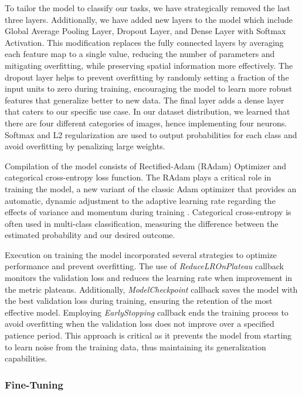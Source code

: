 To tailor the model to classify our tasks, we have strategically removed the last three layers. Additionally, we have added new layers to the model which include Global Average Pooling Layer, Dropout Layer, and Dense Layer with Softmax Activation. This modification replaces the fully connected layers by averaging each feature map to a single value, reducing the number of parameters and mitigating overfitting, while preserving spatial information more effectively. The dropout layer helps to prevent overfitting by randomly setting a fraction of the input units to zero during training, encouraging the model to learn more robust features that generalize better to new data. The final layer adds a dense layer that caters to our specific use case. In our dataset distribution, we learned that there are four different categories of images, hence implementing four neurons. Softmax and L2 regularization are used to output probabilities for each class and avoid overfitting by penalizing large weights.

Compilation of the model consists of Rectified-Adam (RAdam) Optimizer and categorical cross-entropy loss function. The RAdam plays a critical role in training the model, a new variant of the classic Adam optimizer that provides an automatic, dynamic adjustment to the adaptive learning rate regarding the effects of variance and momentum during training \cite{Balut_2020}. Categorical cross-entropy is often used in multi-class classification, measuring the difference between the estimated probability and our desired outcome.

Execution on training the model incorporated several strategies to optimize performance and prevent overfitting. The use of \textit{ReduceLROnPlateau} callback monitors the validation loss and reduces the learning rate when improvement in the metric plateaus. Additionally, \textit{ModelCheckpoint} callback saves the model with the best validation loss during training, ensuring the retention of the most effective model. Employing \textit{EarlyStopping} callback ends the training process to avoid overfitting when the validation loss does not improve over a specified patience period. This approach is critical as it prevents the model from starting to learn noise from the training data, thus maintaining its generalization capabilities.


\subsubsection{Fine-Tuning}

